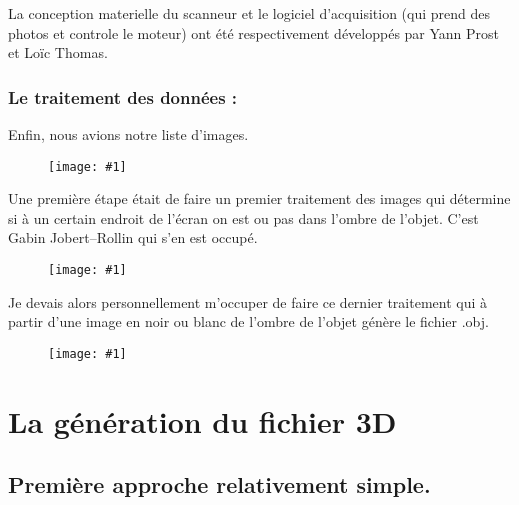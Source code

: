\documentclass{article}
\newcommand*{\unefiguregraphicsimple}[1]{\begin{figure}[!h] \centering \texttt{[image: \#1]}\end{figure}}
\begin{document}
La conception materielle du scanneur et le logiciel d'acquisition
(qui prend des photos et controle le moteur) ont été respectivement
développés par Yann Prost et Loïc Thomas.

\subsubsection*{Le traitement des données :}

Enfin, nous avions notre liste d'images.

\unefiguregraphicsimple{5}

Une première étape était de faire un premier traitement des images
qui détermine si à un certain endroit de l'écran on est ou pas dans
l'ombre de l'objet. C'est Gabin Jobert--Rollin qui s'en est occupé.

\unefiguregraphicsimple{6}

Je devais alors personnellement m'occuper de faire ce dernier traitement
qui à partir d'une image en noir ou blanc de l'ombre de l'objet génère 
le fichier .obj.

\unefiguregraphicsimple{9}

\section*{La génération du fichier 3D}

\subsection*{Première approche relativement simple.}
\end{document}
